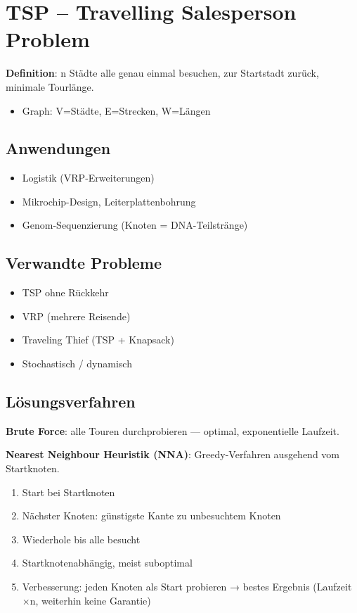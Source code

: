 \documentclass[11pt, a4paper]{article}
\begin{document}
\section{TSP – Travelling Salesperson Problem}

\textbf{Definition}: n Städte alle genau einmal besuchen, zur Startstadt zurück, minimale Tourlänge.

\begin{itemize}
  \item Graph: V=Städte, E=Strecken, W=Längen
\end{itemize}


\subsection{Anwendungen}
\begin{itemize}
  \item Logistik (VRP-Erweiterungen)
  \item Mikrochip-Design, Leiterplattenbohrung
  \item Genom-Sequenzierung (Knoten = DNA-Teilstränge)
\end{itemize}


\subsection{Verwandte Probleme}
\begin{itemize}
  \item TSP ohne Rückkehr
  \item VRP (mehrere Reisende)
  \item Traveling Thief (TSP + Knapsack)
  \item Stochastisch / dynamisch
\end{itemize}


\subsection{Lösungsverfahren}

\textbf{Brute Force}: alle Touren durchprobieren — optimal, exponentielle Laufzeit.


\textbf{Nearest Neighbour Heuristik (NNA)}: Greedy-Verfahren ausgehend vom Startknoten.

\begin{enumerate}
  \item Start bei Startknoten
  \item Nächster Knoten: günstigste Kante zu unbesuchtem Knoten
  \item Wiederhole bis alle besucht
  \item Startknotenabhängig, meist suboptimal
  \item Verbesserung: jeden Knoten als Start probieren → bestes Ergebnis (Laufzeit ×n, weiterhin keine Garantie)
\end{enumerate}
\end{document}

